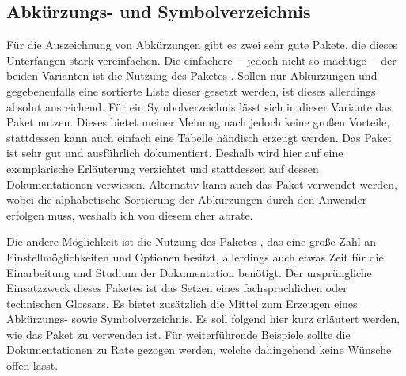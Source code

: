\documentclass[%
  english,ngerman,%
  cdgeometry=no,DIV=12,%
  cd=false,cdfont=false,cdtitle=true,%
  headings=normal,%
  automark,%
  listof=toc,%
]{tudscrartcl}
\begin{document}
\subsection{%
  Abkürzungs- und Symbolverzeichnis%
  \label{sec:glossaries}%
}

Für die Auszeichnung von Abkürzungen gibt es zwei sehr gute Pakete, die dieses 
Unterfangen stark vereinfachen. Die einfachere~-- jedoch nicht so mächtige~-- 
der beiden Varianten ist die Nutzung des Paketes . Sollen nur 
Abkürzungen und gegebenenfalls eine sortierte Liste dieser gesetzt werden, ist 
dieses allerdings absolut ausreichend. Für ein Symbolverzeichnis lässt sich in 
dieser Variante das Paket  nutzen. Dieses bietet meiner 
Meinung nach jedoch keine großen Vorteile, stattdessen kann auch einfach eine 
Tabelle händisch erzeugt werden. Das Paket  ist sehr gut und 
ausführlich dokumentiert. Deshalb wird hier auf eine exemplarische Erläuterung 
verzichtet und stattdessen auf dessen Dokumentationen verwiesen. Alternativ 
kann auch das Paket  verwendet werden, wobei die alphabetische 
Sortierung der Abkürzungen durch den Anwender erfolgen muss, weshalb ich von 
diesem eher abrate.

Die andere Möglichkeit ist die Nutzung des Paketes , das 
eine große Zahl an Einstellmöglichkeiten und Optionen besitzt, allerdings auch 
etwas Zeit für die Einarbeitung und Studium der Dokumentation benötigt. Der 
ursprüngliche Einsatzzweck dieses Paketes ist das Setzen eines fachsprachlichen 
oder technischen Glossars. Es bietet zusätzlich die Mittel zum Erzeugen eines 
Abkürzungs- sowie Symbolverzeichnis. Es soll folgend hier kurz erläutert 
werden, wie das Paket zu verwenden ist. Für weiterführende Beispiele sollte 
die Dokumentationen zu Rate gezogen werden, welche dahingehend keine Wünsche 
offen lässt. 
\end{document}
